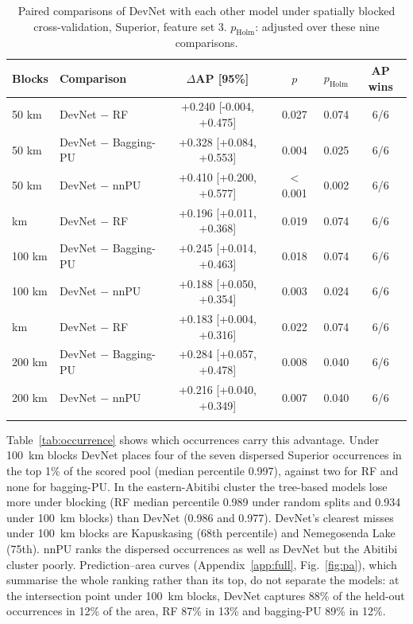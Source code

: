 \documentclass[pdflatex,sn-apa]{sn-jnl}
\begin{document}
\begin{table}[t]
\caption{Paired comparisons of DevNet with each other model under spatially blocked cross-validation, Superior, feature set 3. $p_{\mathrm{Holm}}$: adjusted over these nine comparisons.}\label{tab:spatial-boot}
\footnotesize
\begin{tabular*}{\textwidth}{@{\extracolsep\fill}llcccc}
\toprule
Blocks & Comparison & $\Delta$AP [95\%] & $p$ & $p_{\mathrm{Holm}}$ & AP wins \\
\midrule
50 km & DevNet $-$ RF & +0.240 [-0.004, +0.475] & 0.027 & 0.074 & 6/6 \\
50 km & DevNet $-$ Bagging-PU & +0.328 [+0.084, +0.553] & 0.004 & 0.025 & 6/6 \\
50 km & DevNet $-$ nnPU & +0.410 [+0.200, +0.577] & $<$0.001 & 0.002 & 6/6 \\
\addlinespace
100 km & DevNet $-$ RF & +0.196 [+0.011, +0.368] & 0.019 & 0.074 & 6/6 \\
100 km & DevNet $-$ Bagging-PU & +0.245 [+0.014, +0.463] & 0.018 & 0.074 & 6/6 \\
100 km & DevNet $-$ nnPU & +0.188 [+0.050, +0.354] & 0.003 & 0.024 & 6/6 \\
\addlinespace
200 km & DevNet $-$ RF & +0.183 [+0.004, +0.316] & 0.022 & 0.074 & 6/6 \\
200 km & DevNet $-$ Bagging-PU & +0.284 [+0.057, +0.478] & 0.008 & 0.040 & 6/6 \\
200 km & DevNet $-$ nnPU & +0.216 [+0.040, +0.349] & 0.007 & 0.040 & 6/6 \\
\botrule
\end{tabular*}
\end{table}

Table~\ref{tab:occurrence} shows which occurrences carry this advantage. Under 100~km blocks DevNet places four of the seven dispersed Superior occurrences in the top 1\% of the scored pool (median percentile 0.997), against two for RF and none for bagging-PU. In the eastern-Abitibi cluster the tree-based models lose more under blocking (RF median percentile 0.989 under random splits and 0.934 under 100~km blocks) than DevNet (0.986 and 0.977). DevNet's clearest misses under 100~km blocks are Kapuskasing (68th percentile) and Nemegosenda Lake (75th). nnPU ranks the dispersed occurrences as well as DevNet but the Abitibi cluster poorly. Prediction--area curves (Appendix~\ref{app:full}, Fig.~\ref{fig:pa}), which summarise the whole ranking rather than its top, do not separate the models: at the intersection point under 100~km blocks, DevNet captures 88\% of the held-out occurrences in 12\% of the area, RF 87\% in 13\% and bagging-PU 89\% in 12\%.
\end{document}
